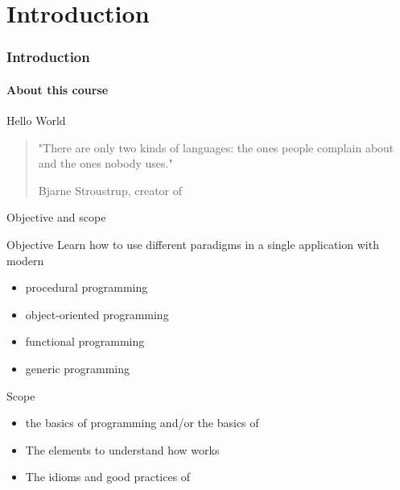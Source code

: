\part{Introduction}

\section{Introduction}

\subsection{About this course}

\begin{frame}{Hello World}{}
  \begin{center}

    \bigskip

    \begin{quote}
      "There are only two kinds of languages: the ones people complain about and the ones nobody uses."
      \begin{flushright}
        \upshape Bjarne Stroustrup, creator of \CCLang
      \end{flushright}
    \end{quote}
  \end{center}
\end{frame}

\begin{frame}{Objective and scope}{}
  \begin{block}{Objective}
    Learn how to use different paradigms in a single application with modern \CCLang

    \begin{itemize}
    \item
      procedural programming
    \item
      object-oriented programming
    \item
      functional programming
    \item
      generic programming
    \end{itemize}
  \end{block}

  \begin{block}{Scope}
    \begin{itemize}
    \item
       the basics of programming and/or the basics of \CCLang
    \item
      The elements to understand how \CCLang works
    \item
      The idioms and good practices of \CCLang
    \end{itemize}
  \end{block}
\end{frame}

